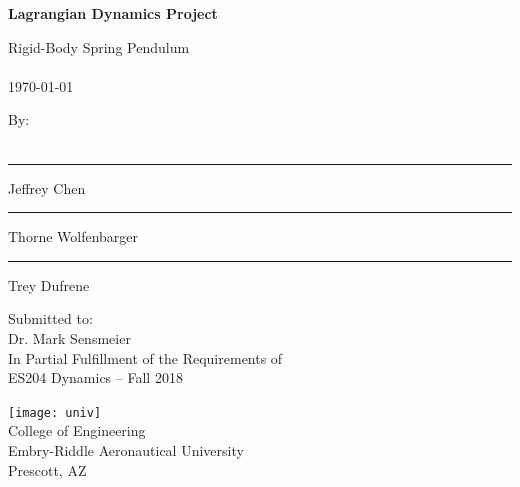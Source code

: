 \begin{titlepage}
  \begin{center}
      \vspace*{1cm}

      \Large
      \textbf{Lagrangian Dynamics Project}

      \vspace{0.5cm}
      \large
      Rigid-Body Spring Pendulum \\
      ~\\
      \normalsize \today

      \vspace{1.5cm}

      \large
      By: \\
      ~\\
      \normalsize
      \vspace{4ex}
      \begin{multicols}{3}
        \hrule
        \vspace{3ex}
        Jeffrey Chen
        \vfill\null
        \columnbreak
        \hrule
        \vspace{3ex}
        Thorne Wolfenbarger
        \vfill\null
        \columnbreak
        \hrule
        \vspace{3ex}
        Trey Dufrene
        \vfill\null
        \columnbreak
      \end{multicols}
      \vfill

      \vspace{0.8cm}

      \large
      Submitted to: \\
      Dr. Mark Sensmeier \\
      In Partial Fulfillment of the Requirements of \\
      ES204 Dynamics -- Fall 2018\\

      \vspace{0.8cm}

      \texttt{[image: univ]}
      ~\\
      College of Engineering\\
      Embry-Riddle Aeronautical University\\
      Prescott, AZ\\

  \end{center}
\end{titlepage}
